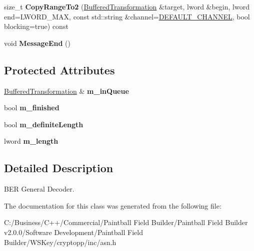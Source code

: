 \begin{DoxyCompactItemize}
\item 
\hypertarget{class_b_e_r_general_decoder_ae71aadf007b2f1c13c3bf830f6266e61}{
size\_\-t {\bfseries CopyRangeTo2} (\hyperlink{class_buffered_transformation}{BufferedTransformation} \&target, lword \&begin, lword end=LWORD\_\-MAX, const std::string \&channel=\hyperlink{cryptlib_8h_a6f1917f54ea8c2a45de6e08c5087c8de}{DEFAULT\_\-CHANNEL}, bool blocking=true) const }
\label{class_b_e_r_general_decoder_ae71aadf007b2f1c13c3bf830f6266e61}

\item 
\hypertarget{class_b_e_r_general_decoder_a40b14625c98ac7febb8ca218d02358ad}{
void {\bfseries MessageEnd} ()}
\label{class_b_e_r_general_decoder_a40b14625c98ac7febb8ca218d02358ad}

\end{DoxyCompactItemize}
\subsection*{Protected Attributes}
\begin{DoxyCompactItemize}
\item 
\hypertarget{class_b_e_r_general_decoder_a29c44ea3a6c6cdf63c58046d8ab22266}{
\hyperlink{class_buffered_transformation}{BufferedTransformation} \& {\bfseries m\_\-inQueue}}
\label{class_b_e_r_general_decoder_a29c44ea3a6c6cdf63c58046d8ab22266}

\item 
\hypertarget{class_b_e_r_general_decoder_a5eb4279b5ed2b47bc9811d4bff81b532}{
bool {\bfseries m\_\-finished}}
\label{class_b_e_r_general_decoder_a5eb4279b5ed2b47bc9811d4bff81b532}

\item 
\hypertarget{class_b_e_r_general_decoder_aa9337ce30f65285a708bcb91b12524c8}{
bool {\bfseries m\_\-definiteLength}}
\label{class_b_e_r_general_decoder_aa9337ce30f65285a708bcb91b12524c8}

\item 
\hypertarget{class_b_e_r_general_decoder_a11096d3b64df9f0b3ff3d8d74be9b3c3}{
lword {\bfseries m\_\-length}}
\label{class_b_e_r_general_decoder_a11096d3b64df9f0b3ff3d8d74be9b3c3}

\end{DoxyCompactItemize}


\subsection{Detailed Description}
BER General Decoder. 

The documentation for this class was generated from the following file:\begin{DoxyCompactItemize}
\item 
C:/Business/C++/Commercial/Paintball Field Builder/Paintball Field Builder v2.0.0/Software Development/Paintball Field Builder/WSKey/cryptopp/inc/asn.h\end{DoxyCompactItemize}
